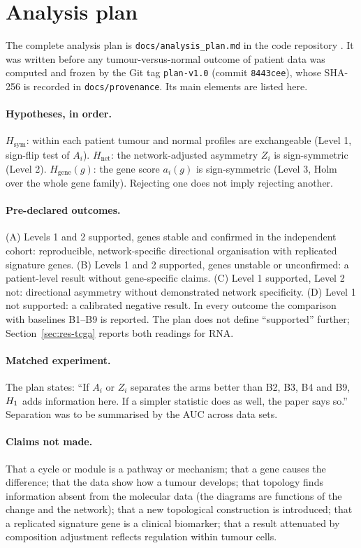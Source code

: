 \section{Analysis plan}\label{sec:plan}

The complete analysis plan is \texttt{docs/analysis\_plan.md} in the code repository \coderepo. It was written before any tumour-versus-normal outcome of patient data was computed and frozen by the Git tag \texttt{plan-v1.0} (commit \texttt{8443cee}), whose SHA-256 is recorded in \texttt{docs/provenance}. Its main elements are listed here.

\paragraph{Hypotheses, in order.} $H_{\mathrm{sym}}$: within each patient tumour and normal profiles are exchangeable (Level 1, sign-flip test of $A_i$). $H_{\mathrm{net}}$: the network-adjusted asymmetry $Z_i$ is sign-symmetric (Level 2). $H_{\mathrm{gene}}(g)$: the gene score $a_i(g)$ is sign-symmetric (Level 3, Holm over the whole gene family). Rejecting one does not imply rejecting another.

\paragraph{Pre-declared outcomes.} (A) Levels 1 and 2 supported, genes stable and confirmed in the independent cohort: reproducible, network-specific directional organisation with replicated signature genes. (B) Levels 1 and 2 supported, genes unstable or unconfirmed: a patient-level result without gene-specific claims. (C) Level 1 supported, Level 2 not: directional asymmetry without demonstrated network specificity. (D) Level 1 not supported: a calibrated negative result. In every outcome the comparison with baselines B1--B9 is reported. The plan does not define ``supported'' further; Section~\ref{sec:res-tcga} reports both readings for RNA.

\paragraph{Matched experiment.} The plan states: ``If $A_i$ or $Z_i$ separates the arms better than B2, B3, B4 and B9, $H_{1}$ adds information here. If a simpler statistic does as well, the paper says so.'' Separation was to be summarised by the AUC across data sets.

\paragraph{Claims not made.} That a cycle or module is a pathway or mechanism; that a gene causes the difference; that the data show how a tumour develops; that topology finds information absent from the molecular data (the diagrams are functions of the change and the network); that a new topological construction is introduced; that a replicated signature gene is a clinical biomarker; that a result attenuated by composition adjustment reflects regulation within tumour cells.

